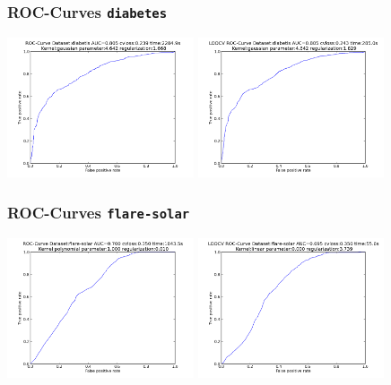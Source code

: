 \begin{frame}
	\frametitle{ROC-Curves \texttt{diabetes}}
	\includegraphics[width=5.5cm]{../report/images/diabetis.png}
	\includegraphics[width=5.5cm]{../report/images/diabetisLOOCV.png}
\end{frame}

\begin{frame}
	\frametitle{ROC-Curves \texttt{flare-solar}}
	\includegraphics[width=5.5cm]{../report/images/flaresolar.png}
	\includegraphics[width=5.5cm]{../report/images/flaresolarLOOCV.png}
\end{frame}

